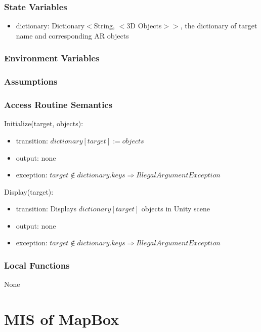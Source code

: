 \documentclass[12pt, titlepage]{article}
\begin{document}
\subsubsection{State Variables}

\begin{itemize}
\item dictionary: Dictionary$<$String, $<$3D Objects$>$$>$, the dictionary of target name and corresponding AR objects
\end{itemize}

\subsubsection{Environment Variables}

\subsubsection{Assumptions}

\subsubsection{Access Routine Semantics}

\noindent Initialize(target, objects):
\begin{itemize}
\item transition: $dictionary[target] := objects$
\item output: none
\item exception: $target \notin dictionary.keys \Rightarrow IllegalArgument Exception$
\end{itemize}

\noindent Display(target):
\begin{itemize}
\item transition: Displays $dictionary[target]$ objects in Unity scene
\item output: none
\item exception: $target \notin dictionary.keys \Rightarrow IllegalArgument Exception$
\end{itemize}

\subsubsection{Local Functions}

None

\newpage

\section{MIS of MapBox} \label{mMap}
\end{document}
